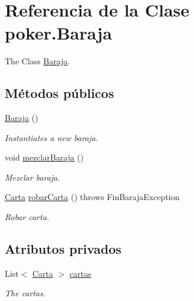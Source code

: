 \hypertarget{classpoker_1_1Baraja}{}\section{Referencia de la Clase poker.\+Baraja}
\label{classpoker_1_1Baraja}


The Class \mbox{\hyperlink{classpoker_1_1Baraja}{Baraja}}.  


\subsection*{Métodos públicos}
\begin{DoxyCompactItemize}
\item 
\mbox{\hyperlink{classpoker_1_1Baraja_aa3003f220dd7f18565095c2f34bc4ff7}{Baraja}} ()
\begin{DoxyCompactList}\small\item\em Instantiates a new baraja. \end{DoxyCompactList}\item 
void \mbox{\hyperlink{classpoker_1_1Baraja_a83f7910d78df1da64aefdf640a9fefe7}{mezclar\+Baraja}} ()
\begin{DoxyCompactList}\small\item\em Mezclar baraja. \end{DoxyCompactList}\item 
\mbox{\hyperlink{classpoker_1_1Carta}{Carta}} \mbox{\hyperlink{classpoker_1_1Baraja_a2eaf33a7d657fb1f5181d0c5307c300b}{robar\+Carta}} ()  throws Fin\+Baraja\+Exception 
\begin{DoxyCompactList}\small\item\em Robar carta. \end{DoxyCompactList}\end{DoxyCompactItemize}
\subsection*{Atributos privados}
\begin{DoxyCompactItemize}
\item 
List$<$ \mbox{\hyperlink{classpoker_1_1Carta}{Carta}} $>$ \mbox{\hyperlink{classpoker_1_1Baraja_a267e10bf1a0fadd4b1bfa3f243fdfcf6}{cartas}}
\begin{DoxyCompactList}\small\item\em The cartas. \end{DoxyCompactList}\end{DoxyCompactItemize}


